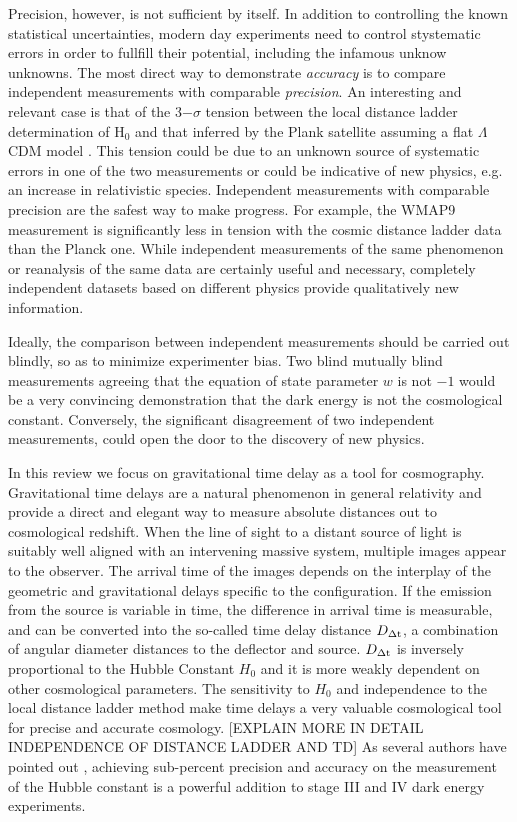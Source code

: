 Precision, however, is not sufficient by itself. In addition to
controlling the known statistical uncertainties, modern day
experiments need to control stystematic errors in order to fullfill
their potential, including the infamous unknow unknowns. The most
direct way to demonstrate {\it accuracy} is to compare independent
measurements with comparable {\it precision}. An interesting and
relevant case is that of the 3$-\sigma$ tension between the local
distance ladder determination of H$_0$ \cite{Rie++16} and that
inferred by the Plank satellite assuming a flat $\Lambda$CDM model
\cite{Pla+15}. This tension could be due to an unknown source of systematic
errors in one of the two measurements or could be indicative of new
physics, e.g. an increase in relativistic species. Independent
measurements with comparable precision are the safest way to make
progress. For example, the WMAP9 measurement \cite{Cal++13} is
significantly less in tension with the cosmic distance ladder data
than the Planck one. While independent measurements of the same
phenomenon or reanalysis of the same data \cite{Efs14,SFH15} are
certainly useful and necessary, completely independent datasets based
on different physics provide qualitatively new information.

Ideally, the comparison between independent measurements should be
carried out blindly, so as to minimize experimenter bias. Two blind
mutually blind measurements agreeing that the equation of state
parameter $w$ is not $-1$ would be a very convincing demonstration
that the dark energy is not the cosmological constant. Conversely, the
significant disagreement of two independent measurements, could open
the door to the discovery of new physics.

In this review we focus on gravitational time delay as a tool for
cosmography.  Gravitational time delays are a natural phenomenon in
general relativity and provide a direct and elegant way to measure
absolute distances out to cosmological redshift. When the line of
sight to a distant source of light is suitably well aligned with an
intervening massive system, multiple images appear to the
observer. The arrival time of the images depends on the interplay of
the geometric and gravitational delays specific to the
configuration. If the emission from the source is variable in time,
the difference in arrival time is measurable, and can be converted
into the so-called time delay distance $D_{\Delta{\rm t}}$, a combination of
angular diameter distances to the deflector and source. $D_{\Delta{\rm t}}$ is
inversely proportional to the Hubble Constant $H_0$ and it is more
weakly dependent on other cosmological parameters. The sensitivity to
$H_0$ and independence to the local distance ladder method make time
delays a very valuable cosmological tool for precise and accurate
cosmology. [EXPLAIN MORE IN DETAIL INDEPENDENCE OF DISTANCE LADDER AND
TD] As several authors have pointed out
\citep{Lin11,Suy++12,Wei++13}, achieving sub-percent precision and
accuracy on the measurement of the Hubble constant is a powerful
addition to stage III and IV dark energy experiments.

